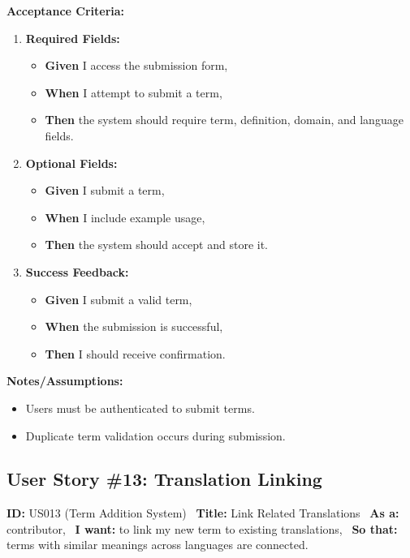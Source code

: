\documentclass[12pt]{article}
\begin{document}
\vspace{1em}
\textbf{Acceptance Criteria:}
\begin{enumerate}
\item \textbf{Required Fields:}
\begin{itemize}
\item \textbf{Given} I access the submission form,
\item \textbf{When} I attempt to submit a term,
\item \textbf{Then} the system should require term, definition, domain, and language fields.
\end{itemize}

\item \textbf{Optional Fields:}
\begin{itemize}
    \item \textbf{Given} I submit a term,
    \item \textbf{When} I include example usage,
    \item \textbf{Then} the system should accept and store it.
\end{itemize}

\item \textbf{Success Feedback:}
\begin{itemize}
    \item \textbf{Given} I submit a valid term,
    \item \textbf{When} the submission is successful,
    \item \textbf{Then} I should receive confirmation.
\end{itemize}
\end{enumerate}

\vspace{1em}
\textbf{Notes/Assumptions:}
\begin{itemize}
\item Users must be authenticated to submit terms.
\item Duplicate term validation occurs during submission.
\end{itemize}

\subsection{User Story \#13: Translation Linking}
\textbf{ID:} US013 (Term Addition System) \
\textbf{Title:} Link Related Translations \
\textbf{As a:} contributor, \
\textbf{I want:} to link my new term to existing translations, \
\textbf{So that:} terms with similar meanings across languages are connected.
\end{document}
